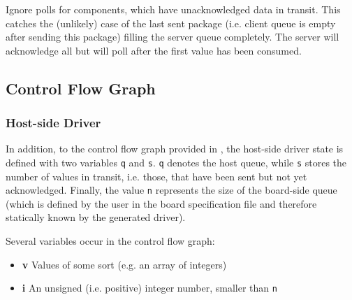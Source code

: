 \documentclass{report}
\begin{document}
\begin{mathpar}
\end{mathpar}
Ignore polls for components, which have unacknowledged data in transit. This catches the (unlikely) case of the last sent package (i.e. client queue is empty after sending this package) filling the server queue completely. The server will acknowledge all but will poll after the first value has been consumed.


\newpage
\subsection{Control Flow Graph}

\subsubsection{Host-side Driver}
In addition, to the control flow graph provided in , the host-side driver state is defined with two variables \texttt{q} and \texttt{s}. \texttt{q} denotes the host queue, while \texttt{s} stores the number of values in transit, i.e. those, that have been sent but not yet acknowledged. Finally, the value \texttt{n} represents the size of the board-side queue (which is defined by the user in the board specification file and therefore statically known by the generated driver).

Several variables occur in the control flow graph:
\begin{itemize} \itemsep1pt \parskip0pt 
\item \textbf{v} Values of some sort (e.g. an array of integers)
\item \textbf{i} An unsigned (i.e. positive) integer number, smaller than \texttt{n}
\end{itemize}
\end{document}
